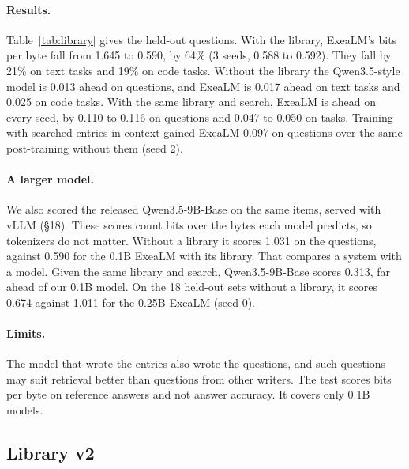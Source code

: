 \documentclass[10pt,twocolumn,letterpaper]{article}
\newcommand{\sect}[1]{\S#1}
\begin{document}
\paragraph{Results.}
Table~\ref{tab:library} gives the held-out questions.
With the library, ExeaLM's bits per byte fall from 1.645 to 0.590, by 64\% (3 seeds, 0.588 to 0.592).
They fall by 21\% on text tasks and 19\% on code tasks.
Without the library the Qwen3.5-style model is 0.013 ahead on questions, and ExeaLM is 0.017 ahead on text tasks and 0.025 on code tasks.
With the same library and search, ExeaLM is ahead on every seed, by 0.110 to 0.116 on questions and 0.047 to 0.050 on tasks.
Training with searched entries in context gained ExeaLM 0.097 on questions over the same post-training without them (seed 2).

\paragraph{A larger model.}
We also scored the released Qwen3.5-9B-Base \citep{qwen35} on the same items, served with vLLM \citep{kwon2023vllm} (\sect{18}).
These scores count bits over the bytes each model predicts, so tokenizers do not matter.
Without a library it scores 1.031 on the questions, against 0.590 for the 0.1B ExeaLM with its library.
That compares a system with a model.
Given the same library and search, Qwen3.5-9B-Base scores 0.313, far ahead of our 0.1B model.
On the 18 held-out sets without a library, it scores 0.674 against 1.011 for the 0.25B ExeaLM (seed 0).

\paragraph{Limits.}
The model that wrote the entries also wrote the questions, and such questions may suit retrieval better than questions from other writers.
The test scores bits per byte on reference answers and not answer accuracy.
It covers only 0.1B models.

\subsection{Library v2}
\end{document}
